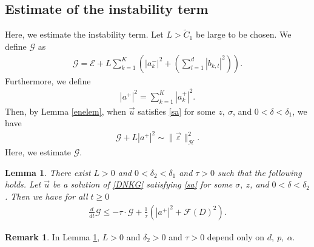 \documentclass[reqno]{amsart}
\theoremstyle{plain}
\newtheorem{lemma}[theorem]{Lemma}
\theoremstyle{definition}
\newtheorem{remark}{Remark}[section]
\numberwithin{equation}{section}
\newcommand{\1}{\mathbbm{1}}
\begin{document}
\subsection{Estimate of the instability term}


Here, we estimate the instability term. Let $L>\tilde{C}_1$ be large to be chosen. We define $\mathcal{G}$ as
\begin{align}\label{Gdef}
\mathcal{G}=\mathcal{E}+L\sum_{k=1}^K\left(|a_k^-|^2+\left(\sum_{l=1}^d|b_{k,l}|^2\right)\right).
\end{align}
Furthermore, we define
\begin{align*}
|a^+|^2=\sum_{k=1}^K |a_k^+|^2.
\end{align*}
Then, by Lemma \ref{enelem}, when $\vec{u}$ satisfies \eqref{sa} for some $z,\ \sigma$, and $0<\delta<\delta_1$, we have
\begin{align}\label{Gdouchi}
\mathcal{G}+L|a^+|^2\sim \|\vec{\varepsilon}\|_{\mathcal{H}}^2. 
\end{align}
Here, we estimate $\mathcal{G}$.

\begin{lemma}\label{Glem}
There exist $L>0$ and $0<\delta_2<\delta_1$ and $\tau>0$ such that the following holds. Let $\vec{u}$ be a solution of \eqref{DNKG} satisfying \eqref{sa} for some $\sigma,\ z$, and $0<\delta<\delta_2$. Then we have for all $t\geq0$
\begin{align}\label{Ges1}
\frac{d}{dt}\mathcal{G}\leq -\tau\cdot \mathcal{G}+\frac{1}{\tau}\left(|a^+|^2+\mathcal{F}(D)^2\right).
\end{align}
\end{lemma}

\begin{remark}
In Lemma \ref{Glem}, $L>0$ and $\delta_2>0$ and $\tau>0$ depend only on $d,\ p,\ \alpha$.

\end{remark}
\end{document}
